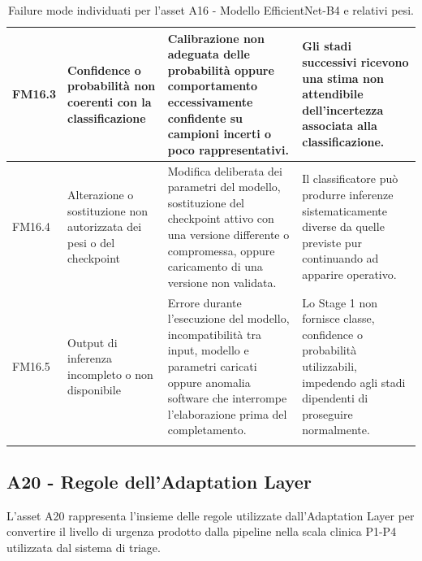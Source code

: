 {\begin{xltabular}{\textwidth}{
    >{\raggedright\arraybackslash}p{1.1cm}
    >{\raggedright\arraybackslash}p{3cm}
    >{\raggedright\arraybackslash}p{5cm}
    X
}
\midrule


FM16.3 &

Confidence o probabilità non coerenti con la classificazione &

Calibrazione non adeguata delle probabilità oppure comportamento
eccessivamente confidente su campioni incerti o poco
rappresentativi. &

Gli stadi successivi ricevono una stima non attendibile
dell'incertezza associata alla classificazione. \\

\midrule


FM16.4\hypertarget{fm16-4}{} &

Alterazione o sostituzione non autorizzata dei pesi o del checkpoint &

Modifica deliberata dei parametri del modello, sostituzione del
checkpoint attivo con una versione differente o compromessa,
oppure caricamento di una versione non validata. &

Il classificatore può produrre inferenze sistematicamente diverse
da quelle previste pur continuando ad apparire operativo. \\

\midrule


FM16.5 &

Output di inferenza incompleto o non disponibile &

Errore durante l'esecuzione del modello, incompatibilità tra input,
modello e parametri caricati oppure anomalia software che interrompe
l'elaborazione prima del completamento. &

Lo Stage 1 non fornisce classe, confidence o probabilità utilizzabili,
impedendo agli stadi dipendenti di proseguire normalmente. \\

\bottomrule

\caption{Failure mode individuati per l'asset A16 - Modello EfficientNet-B4 e relativi pesi.}

\label{tab:a16-failure-modes}\\

\end{xltabular}
}


\subsection{A20 - Regole dell'Adaptation Layer}
L'asset A20 rappresenta l'insieme delle regole utilizzate dall'Adaptation Layer per convertire il livello di urgenza prodotto dalla pipeline nella scala clinica P1-P4 utilizzata dal sistema di
triage.

